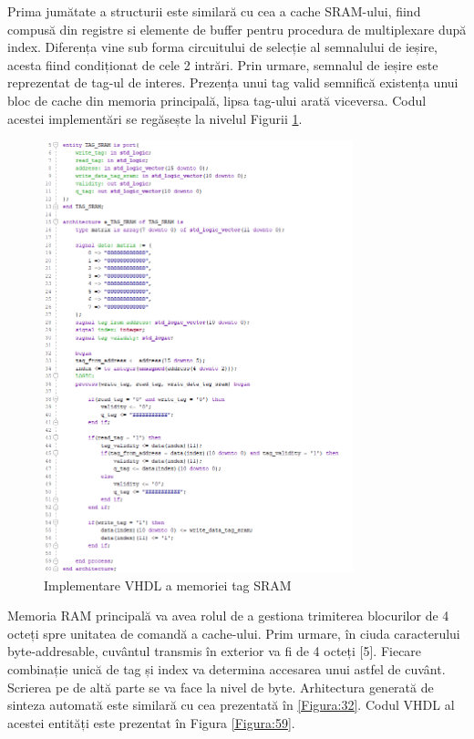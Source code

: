 \documentclass[12pt]{article}
\begin{document}
Prima jumătate a structurii este similară cu cea a cache SRAM-ului, fiind compusă din registre si elemente de buffer pentru procedura de multiplexare după index. Diferența vine sub forma circuitului de selecție al semnalului de ieșire, acesta fiind condiționat de cele 2 intrări. Prin urmare, semnalul de ieșire este reprezentat de tag-ul de interes. Prezența unui tag valid semnifică existența unui bloc de cache din memoria principală, lipsa tag-ului arată viceversa. Codul acestei implementări se regăsește la nivelul Figurii \ref{Figura:58}.

  \begin{figure}[h!]
 \includegraphics[width=0.8\textwidth]{tagsramvhdl.png}
 \centering
 \caption{Implementare VHDL a memoriei tag SRAM}
 \label{Figura:58}
 \end{figure}
  
\newpage
Memoria RAM principală va avea rolul de a gestiona trimiterea blocurilor de 4 octeți spre unitatea de comandă a cache-ului. Prim urmare, în ciuda caracterului byte-addresable, cuvântul transmis în exterior va fi de 4 octeți [5]. Fiecare combinație unică de tag și index va determina accesarea unui astfel de cuvânt. Scrierea pe de altă parte se va face la nivel de byte. Arhitectura generată de sinteza automată este similară cu cea prezentată în \ref{Figura:32}. Codul VHDL al acestei entități este prezentat în Figura \ref{Figura:59}.
\end{document}
